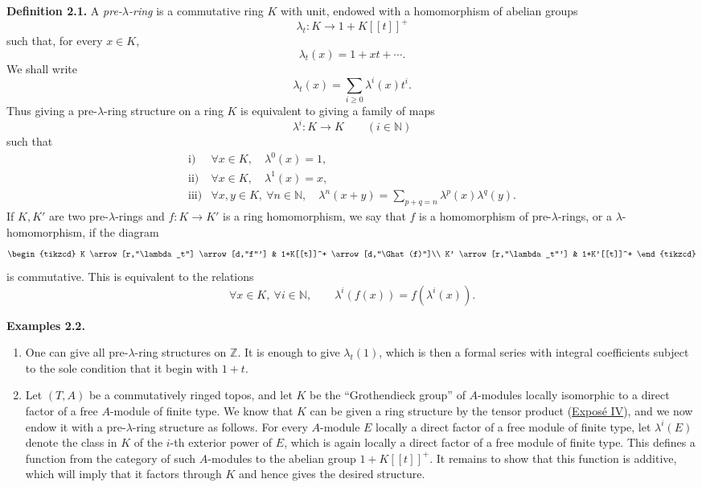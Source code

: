 \textbf{Definition 2.1.} A \emph{pre-\(\lambda\)-ring} is a commutative ring \(K\) with unit, endowed with a homomorphism of abelian groups
\[
  \lambda_t:K\longrightarrow 1+K[[t]]^+
\]
such that, for every \(x\in K\),
\[
  \lambda_t(x)=1+xt+\cdots.
\]
We shall write
\[
  \lambda_t(x)=\sum_{i\geq 0}\lambda^i(x)t^i.
\]
Thus giving a pre-\(\lambda\)-ring structure on a ring \(K\) is equivalent to giving a family of maps
\[
  \lambda^i:K\longrightarrow K\qquad (i\in\mathbb N)
\]
such that
\[
\begin{array}{ll}
\text{i)}&\forall x\in K,\quad \lambda^0(x)=1,\\[0.3em]
\text{ii)}&\forall x\in K,\quad \lambda^1(x)=x,\\[0.3em]
\text{iii)}&\forall x,y\in K,\ \forall n\in\mathbb N,\quad
\lambda^n(x+y)=\displaystyle\sum_{p+q=n}\lambda^p(x)\lambda^q(y).
\end{array}
\]
If \(K,K'\) are two pre-\(\lambda\)-rings and \(f:K\to K'\) is a ring homomorphism, we say that \(f\) is a homomorphism of pre-\(\lambda\)-rings, or a \(\lambda\)-homomorphism, if the diagram
\[
\begin{tikzcd}
K \arrow[r,"\lambda_t"] \arrow[d,"f"'] &
1+K[[t]]^+ \arrow[d,"\Ghat(f)"]\\
K' \arrow[r,"\lambda_t"'] &
1+K'[[t]]^+
\end{tikzcd}
\]
is commutative. This is equivalent to the relations
\[
  \forall x\in K,\ \forall i\in\mathbb N,\qquad
  \lambda^i(f(x))=f(\lambda^i(x)).
\]

\textbf{Examples 2.2.}
\begin{enumerate}[label=\alph*)]
\item One can give all pre-\(\lambda\)-ring structures on \(\mathbb Z\). It is enough to give \(\lambda_t(1)\), which is then a formal series with integral coefficients subject to the sole condition that it begin with \(1+t\).

\item Let \((T,A)\) be a commutatively ringed topos, and let \(K\) be the ``Grothendieck group'' of \(A\)-modules locally isomorphic to a direct factor of a free \(A\)-module of finite type. We know that \(K\) can be given a ring structure by the tensor product (\hyperlink{sga6.e04.expose}{Exposé IV}), and we now endow it with a pre-\(\lambda\)-ring structure as follows. For every \(A\)-module \(E\) locally a direct factor of a free module of finite type, let \(\lambda^i(E)\) denote the class in \(K\) of the \(i\)-th exterior power of \(E\), which is again locally a direct factor of a free module of finite type. This defines a function from the category of such \(A\)-modules to the abelian group \(1+K[[t]]^+\). It remains to show that this function is additive, which will imply that it factors through \(K\) and hence gives the desired structure.
\end{enumerate}

